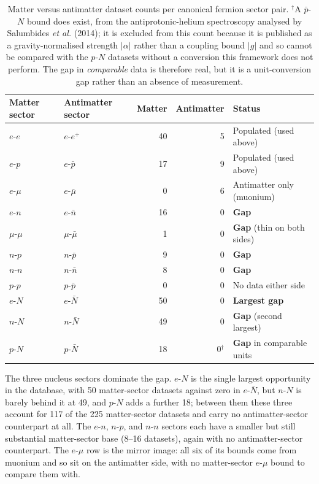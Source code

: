 \begin{table}[h]
\centering
\begin{tabular}{@{}l l r r >{\raggedright\arraybackslash}p{3.2cm}@{}}
\toprule
Matter sector & Antimatter sector & Matter & Antimatter & Status \\
\midrule
$e$-$e$     & $e$-$e^+$      & 40 & 5 & Populated (used above) \\
$e$-$p$     & $e$-$\bar p$   & 17 & 9 & Populated (used above) \\
$e$-$\mu$   & $e$-$\bar\mu$  & 0  & 6 & Antimatter only (muonium) \\
$e$-$n$     & $e$-$\bar n$   & 16 & 0 & \textbf{Gap} \\
$\mu$-$\mu$ & $\mu$-$\bar\mu$& 1  & 0 & \textbf{Gap} (thin on both sides) \\
$n$-$p$     & $n$-$\bar p$   & 9  & 0 & \textbf{Gap} \\
$n$-$n$     & $n$-$\bar n$   & 8  & 0 & \textbf{Gap} \\
$p$-$p$     & $p$-$\bar p$   & 0  & 0 & No data either side \\
$e$-$N$     & $e$-$\bar N$   & 50 & 0 & \textbf{Largest gap} \\
$n$-$N$     & $n$-$\bar N$   & 49 & 0 & \textbf{Gap} (second largest) \\
$p$-$N$     & $p$-$\bar N$   & 18 & 0$^\dagger$ & \textbf{Gap} in comparable units \\
\bottomrule
\end{tabular}
\caption{Matter versus antimatter dataset counts per canonical fermion
sector pair. $^\dagger$A $\bar p$-$N$ bound does exist, from the antiprotonic-helium
spectroscopy analysed by Salumbides \textit{et al.} (2014); it is excluded from this count
because it is published as a gravity-normalised strength $|\alpha|$ rather
than a coupling bound $|g|$ and so cannot be compared with the $p$-$N$
datasets without a conversion this framework does not perform. The gap in
\emph{comparable} data is therefore real, but it is a unit-conversion gap
rather than an absence of measurement.}
\label{tab:sector-gaps}
\end{table}

The three nucleus sectors dominate the gap. $e$-$N$ is the single largest
opportunity in the database, with 50 matter-sector datasets against zero in
$e$-$\bar N$, but $n$-$N$ is barely behind it at 49, and $p$-$N$ adds a
further 18; between them these three account for 117 of the 225
matter-sector datasets and carry no antimatter-sector counterpart at all.
The $e$-$n$, $n$-$p$, and $n$-$n$ sectors each have a smaller but still
substantial matter-sector base (8--16 datasets), again with no
antimatter-sector counterpart. The $e$-$\mu$ row is the mirror image: all
six of its bounds come from muonium and so sit on the antimatter side, with
no matter-sector $e$-$\mu$ bound to compare them with.

